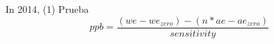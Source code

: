 In 2014,\newline
(1) Prueba 
\cite{Wonham:1614618}
{\small \[ppb = \frac{(we - we_{zero}) - (n*ae - ae_{zero})}{sensitivity}\]}

%
%

\enlargethispage{10\baselineskip}
\FloatBarrier

%	
%
%


%

%
